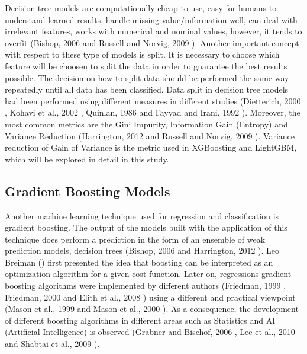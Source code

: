 \documentclass[letterpaper, 10 pt, conference]{ieeeconf}  %
\begin{document}
Decision tree models are computationally cheap to use, easy for humans to understand learned results, handle missing value/information well, can deal with irrelevant features, works with numerical and nominal values, however, it tends to overfit (Bishop, 2006 \cite{Bishop2006} and Russell and Norvig, 2009 \cite{Russell_Norvig2009}). Another important concept with respect to these type of models is split. It is necessary to choose which feature will be choosen to split the data in order to guarantee the best results possible. The decision on how to split data should be performed the same way repeatedly until all data has been classified. Data split in decision tree models had been performed using different measures in different studies (Dietterich, 2000 \cite{Dietterich2000}, Kohavi et al., 2002 \cite{Kohavi_etall2002}, Quinlan, 1986 \cite{Quinlan1986} and Fayyad and Irani, 1992 \cite{Fayyad_Irani1992}). Moreover, the most common metrics are the Gini Impurity, Information Gain (Entropy) and Variance Reduction (Harrington, 2012 \cite{Harrington2012} and Russell and Norvig, 2009 \cite{Russell_Norvig2009}). Variance reduction of Gain of Variance is the metric used in XGBoosting and LightGBM, which will be explored in detail in this study.

\subsection{Gradient Boosting Models}

Another machine learning technique used for regression and classification is gradient boosting. The output of the models built with the application of this technique does perform a prediction in the form of an ensemble of weak prediction models, decision trees (Bishop, 2006 \cite{Bishop2006} and Harrington, 2012 \cite{Harrington2012}). Leo Breiman (\cite{Breiman97}) first presented the idea that boosting can be interpreted as an optimization algorithm for a given cost function. Later on, regressions gradient boosting algorithms were implemented by different authors (Friedman, 1999 \cite{Friedman2000}, Friedman, 2000 \cite{Friedman2000} and Elith et al., 2008 \cite{Elith2008}) using a different and practical viewpoint (Mason et al., 1999 \cite{Mason99} and Mason et al., 2000 \cite{Mason00}). As a consequence, the development of different boosting algorithms in different areas such as Statistics and AI (Artificial Intelligence) is observed (Grabner and Bischof, 2006 \cite{Grabner2006}, Lee et al., 2010 \cite{Lee2010} and Shabtai et al., 2009 \cite{SHABTAI2009}).\\
\end{document}
